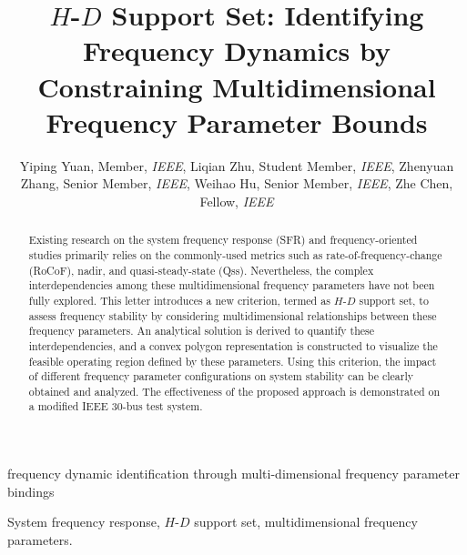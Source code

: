 \documentclass[lettersize,journal]{IEEEtran}
\begin{document}


\title{\vspace{-0.5cm}
$H$-$D$ Support Set:  Identifying Frequency Dynamics by Constraining Multidimensional Frequency Parameter Bounds
}
\author{Yiping Yuan, Member, \textit{IEEE}, Liqian Zhu, Student Member, \textit{IEEE}, Zhenyuan Zhang, Senior Member, \textit{IEEE}, Weihao Hu, Senior Member, \textit{IEEE}, Zhe Chen, Fellow, \textit{IEEE}
}
\IEEEaftertitletext{\vspace{-2.5\baselineskip}}

%
{frequency dynamic identification through multi-dimensional frequency parameter bindings}

\maketitle


\begin{abstract}

  Existing research on the system frequency response (SFR) and frequency-oriented studies primarily relies on the commonly-used metrics such as  rate-of-frequency-change (RoCoF), nadir, and quasi-steady-state (Qss). Nevertheless, the complex interdependencies among these multidimensional frequency parameters have not been fully explored. This letter introduces a new criterion, termed as $H$-$D$ support set, to assess frequency stability by considering multidimensional relationships between these frequency parameters. An analytical solution is derived to quantify these interdependencies, and a convex polygon representation is constructed to visualize the feasible operating region defined by these parameters. Using this criterion, the impact of different frequency parameter configurations on system stability can be clearly obtained and analyzed. The effectiveness of the proposed approach is demonstrated on a modified IEEE 30-bus test system.

\end{abstract}

\begin{IEEEkeywords}
System frequency response, $H$-$D$ support set, multidimensional frequency parameters.
\end{IEEEkeywords}
\end{document}

